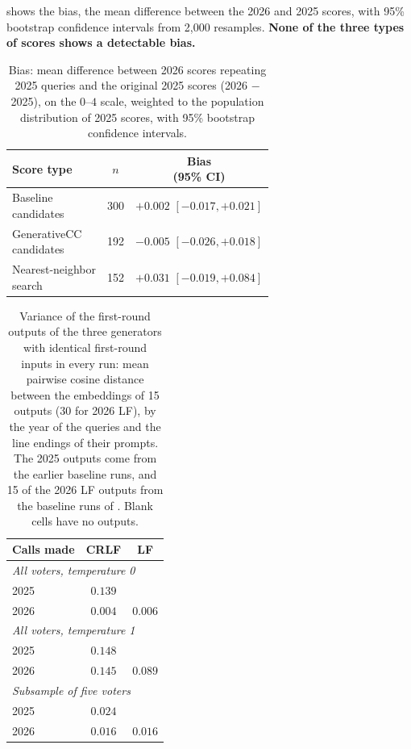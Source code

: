 \documentclass[letterpaper]{article} %
\begin{document}
 shows the bias, the mean difference between the 2026 and 2025 scores, with 95\% bootstrap confidence intervals from 2{,}000 resamples.
\textbf{None of the three types of scores shows a detectable bias.}

\begin{table}[t]
\centering
\begin{tabular}{lcc}
\hline
Score type & \(n\) & \makecell{Bias\\(95\% CI)} \\
\hline
\makecell[l]{Baseline\\candidates} & 300 & \makecell{\(+0.002\)\\\([-0.017, +0.021]\)} \\
\hline
\makecell[l]{GenerativeCC\\candidates} & 192 & \makecell{\(-0.005\)\\\([-0.026, +0.018]\)} \\
\hline
\makecell[l]{Nearest-neighbor\\search} & 152 & \makecell{\(+0.031\)\\\([-0.019, +0.084]\)} \\
\hline
\end{tabular}
\caption{Bias: mean difference between 2026 scores repeating 2025 queries and the original 2025 scores (2026 \(-\) 2025), on the \(0\)--\(4\) scale, weighted to the population distribution of 2025 scores, with 95\% bootstrap confidence intervals.}
\label{tab:model-drift-ratings}
\end{table}

\begin{table}[t]
\centering
\begin{tabular}{lcc}
\hline
Calls made & CRLF & LF \\
\hline
\multicolumn{3}{l}{\emph{All voters, temperature 0}} \\
2025 & \(0.139\) & \\
2026 & \(0.004\) & \(0.006\) \\
\hline
\multicolumn{3}{l}{\emph{All voters, temperature 1}} \\
2025 & \(0.148\) & \\
2026 & \(0.145\) & \(0.089\) \\
\hline
\multicolumn{3}{l}{\emph{Subsample of five voters}} \\
2025 & \(0.024\) & \\
2026 & \(0.016\) & \(0.016\) \\
\hline
\end{tabular}
\caption{Variance of the first-round outputs of the three generators with identical first-round inputs in every run: mean pairwise cosine distance between the embeddings of 15 outputs (30 for 2026 LF), by the year of the queries and the line endings of their prompts. The 2025 outputs come from the earlier baseline runs, and 15 of the 2026 LF outputs from the baseline runs of . Blank cells have no outputs.}
\label{tab:model-drift-generation}
\end{table}
\end{document}
